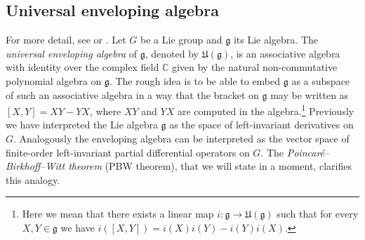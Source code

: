 \documentclass[12pt,oneside,a4paper]{book}
\numberwithin{equation}{section}     %
\theoremstyle{plain}
\theoremstyle{definition}
\begin{document}
\subsection{Universal enveloping algebra} 

For more detail, see \cite[Section 9.3]{H2003} or \cite[Section 1.3]{FR2016}. Let $G$ be a Lie group and $\mathfrak{g}$ its Lie algebra. The \textit{universal enveloping algebra} of $\mathfrak{g}$, denoted by $\mathfrak{U}(\mathfrak{g})$, is an associative algebra with identity over the complex field $\mathbb{C}$ given by the natural non-commutative polynomial algebra on $\mathfrak{g}$. The rough idea is to be able to embed $\mathfrak{g}$ as a subspace of such an associative algebra in a way that the bracket on $\mathfrak{g}$ may be written as $[X,Y]=XY-YX$, where $XY$ and $YX$ are computed in the algebra.\footnote{Here we mean that there exists a linear map $i:\mathfrak{g}\rightarrow \mathfrak{U}(\mathfrak{g})$ such that for every $X,Y\in\mathfrak{g}$ we have $i([X,Y])=i(X)i(Y)-i(Y)i(X)$.} Previously we have interpreted the Lie algebra $\mathfrak{g}$ as the space of left-invariant derivatives on $G$. Analogously the enveloping algebra can be interpreted as the vector space of finite-order left-invariant partial differential operators on $G$. The \textit{Poincar\'e--Birkhoff--Witt theorem} (PBW theorem), that we will state in a moment, clarifies this analogy. 
\end{document}
